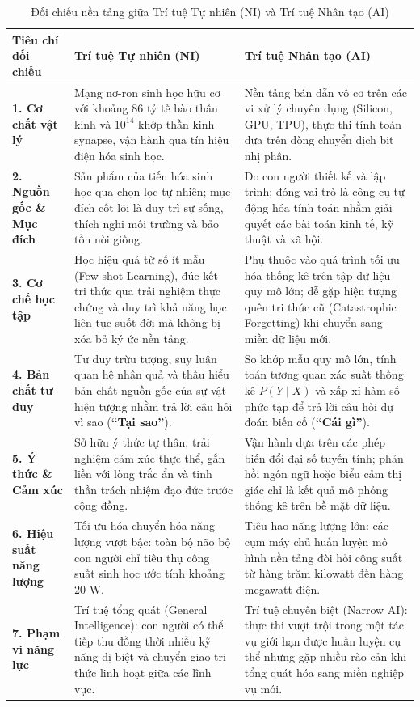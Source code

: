 \begin{table}[H]
\centering
\small
\caption{Đối chiếu nền tảng giữa Trí tuệ Tự nhiên (NI) và Trí tuệ Nhân tạo (AI)}
\label{tab:comp_ni_ai}
\renewcommand{\arraystretch}{1.3}
\begin{tabularx}{\textwidth}{|p{3.0cm}|X|X|}
\hline
\textbf{Tiêu chí đối chiếu} & \textbf{Trí tuệ Tự nhiên (NI)} & \textbf{Trí tuệ Nhân tạo (AI)} \\
\hline
\textbf{1. Cơ chất vật lý} & Mạng nơ-ron sinh học hữu cơ với khoảng $86$ tỷ tế bào thần kinh và $10^{14}$ khớp thần kinh synapse, vận hành qua tín hiệu điện hóa sinh học. & Nền tảng bán dẫn vô cơ trên các vi xử lý chuyên dụng (Silicon, GPU, TPU), thực thi tính toán dựa trên dòng chuyển dịch bit nhị phân. \\
\hline
\textbf{2. Nguồn gốc \& Mục đích} & Sản phẩm của tiến hóa sinh học qua chọn lọc tự nhiên; mục đích cốt lõi là duy trì sự sống, thích nghi môi trường và bảo tồn nòi giống. & Do con người thiết kế và lập trình; đóng vai trò là công cụ tự động hóa tính toán nhằm giải quyết các bài toán kinh tế, kỹ thuật và xã hội. \\
\hline
\textbf{3. Cơ chế học tập} & Học hiệu quả từ số ít mẫu (Few-shot Learning), đúc kết tri thức qua trải nghiệm thực chứng và duy trì khả năng học liên tục suốt đời mà không bị xóa bỏ ký ức nền tảng. & Phụ thuộc vào quá trình tối ưu hóa thống kê trên tập dữ liệu quy mô lớn; dễ gặp hiện tượng quên tri thức cũ (Catastrophic Forgetting) khi chuyển sang miền dữ liệu mới. \\
\hline
\textbf{4. Bản chất tư duy} & Tư duy trừu tượng, suy luận quan hệ nhân quả và thấu hiểu bản chất nguồn gốc của sự vật hiện tượng nhằm trả lời câu hỏi vì sao (\textbf{``Tại sao''}). & So khớp mẫu quy mô lớn, tính toán tương quan xác suất thống kê $P(Y \mid X)$ và xấp xỉ hàm số phức tạp để trả lời câu hỏi dự đoán biến cố (\textbf{``Cái gì''}). \\
\hline
\textbf{5. Ý thức \& Cảm xúc} & Sở hữu ý thức tự thân, trải nghiệm cảm xúc thực thể, gắn liền với lòng trắc ẩn và tinh thần trách nhiệm đạo đức trước cộng đồng. & Vận hành dựa trên các phép biến đổi đại số tuyến tính; phản hồi ngôn ngữ hoặc biểu cảm thị giác chỉ là kết quả mô phỏng thống kê trên bề mặt dữ liệu. \\
\hline
\textbf{6. Hiệu suất năng lượng} & Tối ưu hóa chuyển hóa năng lượng vượt bậc: toàn bộ não bộ con người chỉ tiêu thụ công suất sinh học ước tính khoảng $20\text{ W}$. & Tiêu hao năng lượng lớn: các cụm máy chủ huấn luyện mô hình nền tảng đòi hỏi công suất từ hàng trăm kilowatt đến hàng megawatt điện. \\
\hline
\textbf{7. Phạm vi năng lực} & Trí tuệ tổng quát (General Intelligence): con người có thể tiếp thu đồng thời nhiều kỹ năng dị biệt và chuyển giao tri thức linh hoạt giữa các lĩnh vực. & Trí tuệ chuyên biệt (Narrow AI): thực thi vượt trội trong một tác vụ giới hạn được huấn luyện cụ thể nhưng gặp nhiều rào cản khi tổng quát hóa sang miền nghiệp vụ mới. \\
\hline
\end{tabularx}
\end{table}

